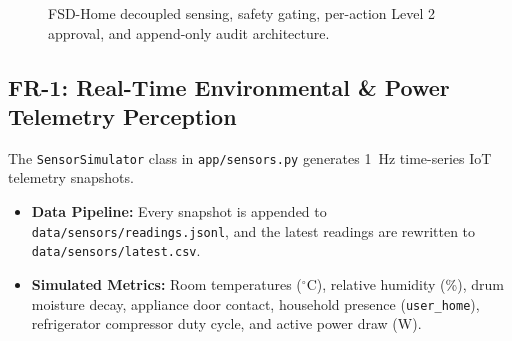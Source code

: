 \documentclass[conference]{IEEEtran}
\begin{document}
\begin{figure}[htbp]
\centering
{}
\caption{FSD-Home decoupled sensing, safety gating, per-action Level 2 approval, and append-only audit architecture.}
\label{fig:arch}
\end{figure}

\subsection{FR-1: Real-Time Environmental \& Power Telemetry Perception}
The \texttt{SensorSimulator} class in \texttt{app/sensors.py} generates 1~Hz time-series IoT telemetry snapshots.
\begin{itemize}
    \item \textbf{Data Pipeline:} Every snapshot is appended to \texttt{data/sensors/readings.jsonl}, and the latest readings are rewritten to \texttt{data/sensors/latest.csv}.
    \item \textbf{Simulated Metrics:} Room temperatures ($^\circ$C), relative humidity (\%), drum moisture decay, appliance door contact, household presence (\texttt{user\_home}), refrigerator compressor duty cycle, and active power draw (W).
\end{itemize}
\end{document}
